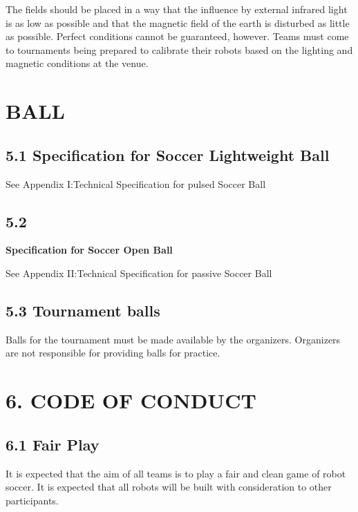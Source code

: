 \documentclass{article}
\begin{document}
The fields should be placed in a way that the influence by external infrared light is as low as possible and that the magnetic field of the earth is disturbed as little as possible. Perfect conditions cannot be guaranteed, however. Teams must come to tournaments being prepared to calibrate their robots based on the lighting and magnetic conditions at the venue.

\section{BALL \label{ref-038}}

\subsection{\textcolor{color-5}{5.1 Specification for Soccer Lightweight Ball}}

\textcolor{color-5}{See Appendix I:Technical Specification for pulsed Soccer Ball}

\subsection{\textcolor{color-5}{5.2}} \textbf{\textcolor{color-5}{Specification for Soccer Open Ball}}

\textcolor{color-5}{See Appendix II:Technical Specification for passive Soccer Ball}

\subsection{5.3 Tournament balls \label{ref-039}}

Balls for the tournament must be made available by the organizers. Organizers are not responsible for providing balls for practice.

\section{6. CODE OF CONDUCT\label{ref-040}}

\subsection{6.1 Fair Play \label{ref-041}}

It is expected that the aim of all teams is to play a fair and clean game of robot soccer. It is expected that all robots will be built with consideration to other participants. 
\end{document}
